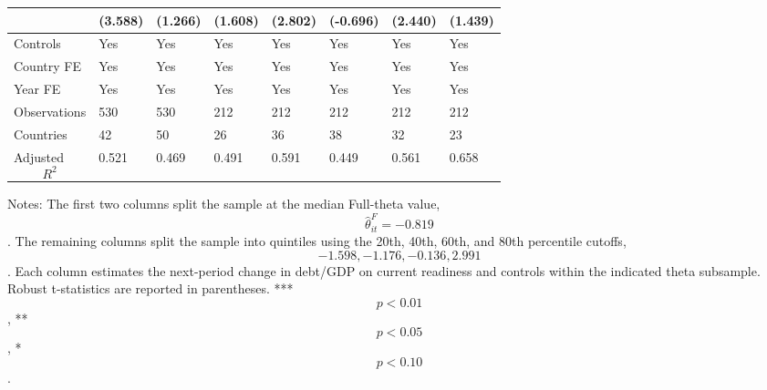 \begin{table}[H]
\begin{threeparttable}
\begin{tabularx}{\textwidth}{lYYYYYYY}
  & (3.588) & (1.266) & (1.608) & (2.802) & (-0.696) & (2.440) & (1.439) \\
\midrule
Controls & Yes & Yes & Yes & Yes & Yes & Yes & Yes \\
Country FE & Yes & Yes & Yes & Yes & Yes & Yes & Yes \\
Year FE & Yes & Yes & Yes & Yes & Yes & Yes & Yes \\
Observations & 530 & 530 & 212 & 212 & 212 & 212 & 212 \\
Countries & 42 & 50 & 26 & 36 & 38 & 32 & 23 \\
Adjusted $$R^2$$ & 0.521 & 0.469 & 0.491 & 0.591 & 0.449 & 0.561 & 0.658 \\
\bottomrule
\end{tabularx}
\begin{tablenotes}[flushleft]\footnotesize
\item Notes: The first two columns split the sample at the median Full-theta value, $$\widehat{\theta}^{F}_{it}=-0.819$$. The remaining columns split the sample into quintiles using the 20th, 40th, 60th, and 80th percentile cutoffs, $$-1.598, -1.176, -0.136, 2.991$$. Each column estimates the next-period change in debt/GDP on current readiness and controls within the indicated theta subsample. Robust t-statistics are reported in parentheses. *** $$p<0.01$$, ** $$p<0.05$$, * $$p<0.10$$.
\end{tablenotes}
\end{threeparttable}
\end{table}
